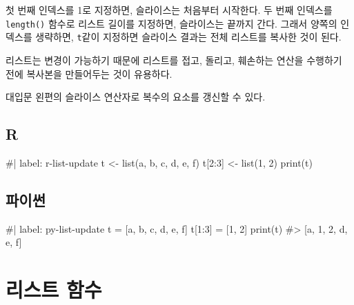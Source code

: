\documentclass[
  letterpaper,
]{book}
\newenvironment{Shaded}{\begin{snugshade}}{\end{snugshade}}
\newcommand{\NormalTok}[1]{\textcolor[rgb]{0.00,0.23,0.31}{#1}}
\begin{document}
첫 번째 인덱스를 1로 지정하면, 슬라이스는 처음부터 시작한다. 두 번째
인덱스를 \texttt{length()} 함수로 리스트 길이를 지정하면, 슬라이스는
끝까지 간다. 그래서 양쪽의 인덱스를 생략하면, \texttt{t}같이 지정하면
슬라이스 결과는 전체 리스트를 복사한 것이 된다. 
 

리스트는 변경이 가능하기 때문에 리스트를 접고, 돌리고, 훼손하는 연산을
수행하기 전에 복사본을 만들어두는 것이 유용하다. 

대입문 왼편의 슬라이스 연산자로 복수의 요소를 갱신할 수 있다.
 

\subsection{R}

\begin{Shaded}
\begin{Highlighting}[]
\NormalTok{\#| label: r{-}list{-}update}
\NormalTok{t \textless{}{-} list(\textquotesingle{}a\textquotesingle{}, \textquotesingle{}b\textquotesingle{}, \textquotesingle{}c\textquotesingle{}, \textquotesingle{}d\textquotesingle{}, \textquotesingle{}e\textquotesingle{}, \textquotesingle{}f\textquotesingle{})}
\NormalTok{t[2:3] \textless{}{-} list(1, 2)}
\NormalTok{print(t)}
\end{Highlighting}
\end{Shaded}

\subsection{파이썬}

\begin{Shaded}
\begin{Highlighting}[]
\NormalTok{\#| label: py{-}list{-}update}
\NormalTok{t = [\textquotesingle{}a\textquotesingle{}, \textquotesingle{}b\textquotesingle{}, \textquotesingle{}c\textquotesingle{}, \textquotesingle{}d\textquotesingle{}, \textquotesingle{}e\textquotesingle{}, \textquotesingle{}f\textquotesingle{}]}
\NormalTok{t[1:3] = [1, 2]}
\NormalTok{print(t)}
\NormalTok{\#\textgreater{} [\textquotesingle{}a\textquotesingle{}, 1, 2, \textquotesingle{}d\textquotesingle{}, \textquotesingle{}e\textquotesingle{}, \textquotesingle{}f\textquotesingle{}]}
\end{Highlighting}
\end{Shaded}

\section{리스트 함수}\label{r-list-function}
\end{document}
